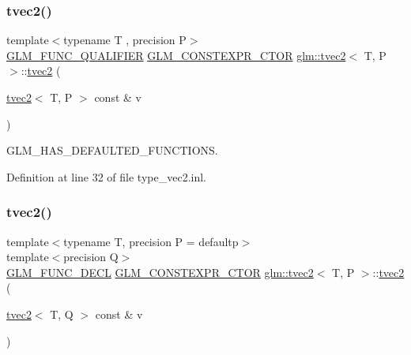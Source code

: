 \mbox{\label{structglm_1_1tvec2_a3c688d3927a3e5e9f30039ce50387727}} 
\subsubsection{\texorpdfstring{tvec2()}{tvec2()}\hspace{0.1cm}{\footnotesize\ttfamily [2/17]}}
{\footnotesize\ttfamily template$<$typename T , precision P$>$ \\
\mbox{\hyperlink{setup_8hpp_a33fdea6f91c5f834105f7415e2a64407}{G\+L\+M\+\_\+\+F\+U\+N\+C\+\_\+\+Q\+U\+A\+L\+I\+F\+I\+ER}} \mbox{\hyperlink{setup_8hpp_ad34178a09666081abdb573c14d1f4a5a}{G\+L\+M\+\_\+\+C\+O\+N\+S\+T\+E\+X\+P\+R\+\_\+\+C\+T\+OR}} \mbox{\hyperlink{structglm_1_1tvec2}{glm\+::tvec2}}$<$ T, P $>$\+::\mbox{\hyperlink{structglm_1_1tvec2}{tvec2}} (\begin{DoxyParamCaption}\item[{\mbox{\hyperlink{structglm_1_1tvec2}{tvec2}}$<$ T, P $>$ const \&}]{v }\end{DoxyParamCaption})}



G\+L\+M\+\_\+\+H\+A\+S\+\_\+\+D\+E\+F\+A\+U\+L\+T\+E\+D\+\_\+\+F\+U\+N\+C\+T\+I\+O\+NS. 



Definition at line 32 of file type\+\_\+vec2.\+inl.

\mbox{\label{structglm_1_1tvec2_ab5d63947a357697675db31c4a31aebc7}} 
\subsubsection{\texorpdfstring{tvec2()}{tvec2()}\hspace{0.1cm}{\footnotesize\ttfamily [3/17]}}
{\footnotesize\ttfamily template$<$typename T, precision P = defaultp$>$ \\
template$<$precision Q$>$ \\
\mbox{\hyperlink{setup_8hpp_ab2d052de21a70539923e9bcbf6e83a51}{G\+L\+M\+\_\+\+F\+U\+N\+C\+\_\+\+D\+E\+CL}} \mbox{\hyperlink{setup_8hpp_ad34178a09666081abdb573c14d1f4a5a}{G\+L\+M\+\_\+\+C\+O\+N\+S\+T\+E\+X\+P\+R\+\_\+\+C\+T\+OR}} \mbox{\hyperlink{structglm_1_1tvec2}{glm\+::tvec2}}$<$ T, P $>$\+::\mbox{\hyperlink{structglm_1_1tvec2}{tvec2}} (\begin{DoxyParamCaption}\item[{\mbox{\hyperlink{structglm_1_1tvec2}{tvec2}}$<$ T, Q $>$ const \&}]{v }\end{DoxyParamCaption})}

